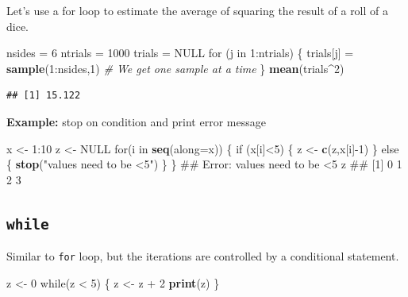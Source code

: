 \documentclass[]{article}
\newenvironment{Shaded}{\begin{snugshade}}{\end{snugshade}}
\newcommand{\KeywordTok}[1]{\textcolor[rgb]{0.13,0.29,0.53}{\textbf{{#1}}}}
\newcommand{\DataTypeTok}[1]{\textcolor[rgb]{0.13,0.29,0.53}{{#1}}}
\newcommand{\DecValTok}[1]{\textcolor[rgb]{0.00,0.00,0.81}{{#1}}}
\newcommand{\StringTok}[1]{\textcolor[rgb]{0.31,0.60,0.02}{{#1}}}
\newcommand{\CommentTok}[1]{\textcolor[rgb]{0.56,0.35,0.01}{\textit{{#1}}}}
\newcommand{\OtherTok}[1]{\textcolor[rgb]{0.56,0.35,0.01}{{#1}}}
\newcommand{\NormalTok}[1]{{#1}}
\numberwithin{equation}{section}
\begin{document}
Let's use a for loop to estimate the average of squaring the result of a
roll of a dice.

\begin{Shaded}
\begin{Highlighting}[]
\NormalTok{nsides =}\StringTok{ }\DecValTok{6}
\NormalTok{ntrials =}\StringTok{ }\DecValTok{1000}
\NormalTok{trials =}\StringTok{ }\OtherTok{NULL}
\NormalTok{for (j in }\DecValTok{1}\NormalTok{:ntrials)}
\NormalTok{\{}
  \NormalTok{trials[j] =}\StringTok{ }\KeywordTok{sample}\NormalTok{(}\DecValTok{1}\NormalTok{:nsides,}\DecValTok{1}\NormalTok{)  }\CommentTok{# We get one sample at a time}
\NormalTok{\}}
\KeywordTok{mean}\NormalTok{(trials^}\DecValTok{2}\NormalTok{)}
\end{Highlighting}
\end{Shaded}

\begin{verbatim}
## [1] 15.122
\end{verbatim}

\textbf{Example:} stop on condition and print error message

\begin{Shaded}
\begin{Highlighting}[]
\NormalTok{x <-}\StringTok{ }\DecValTok{1}\NormalTok{:}\DecValTok{10}
\NormalTok{z <-}\StringTok{ }\OtherTok{NULL}
\NormalTok{for(i in }\KeywordTok{seq}\NormalTok{(}\DataTypeTok{along=}\NormalTok{x)) \{}
    \NormalTok{if (x[i]<}\DecValTok{5}\NormalTok{) \{}
        \NormalTok{z <-}\StringTok{ }\KeywordTok{c}\NormalTok{(z,x[i]-}\DecValTok{1}\NormalTok{) }
    \NormalTok{\} else \{}
        \KeywordTok{stop}\NormalTok{(}\StringTok{"values need to be <5"}\NormalTok{)}
    \NormalTok{\}}
\NormalTok{\}}
\NormalTok{## Error: values need to be <5}
\NormalTok{z}
\NormalTok{## [1] 0 1 2 3}
\end{Highlighting}
\end{Shaded}

\subsection{\texorpdfstring{\texttt{while}}{while}}\label{while}

Similar to \texttt{for} loop, but the iterations are controlled by a
conditional statement.

\begin{Shaded}
\begin{Highlighting}[]
\NormalTok{z <-}\StringTok{ }\DecValTok{0}
\NormalTok{while(z <}\StringTok{ }\DecValTok{5}\NormalTok{) \{}
    \NormalTok{z <-}\StringTok{ }\NormalTok{z +}\StringTok{ }\DecValTok{2}
    \KeywordTok{print}\NormalTok{(z) }
\NormalTok{\}}
\end{Highlighting}
\end{Shaded}
\end{document}
